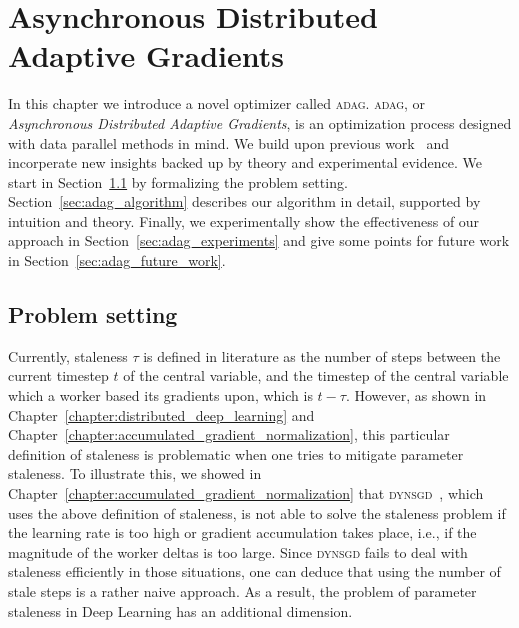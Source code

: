 %
%
%

\chapter{Asynchronous Distributed Adaptive Gradients}
\label{chapter:asynchronous_distributed_adaptive_gradients}

In this chapter we introduce a novel optimizer called \textsc{adag}. \textsc{adag}, or \emph{Asynchronous Distributed Adaptive Gradients}, is an optimization process designed with data parallel methods in mind. We build upon previous work~\cite{dean2012large,hadjis2016omnivore,kingma2014adam,zhang2015deep,jiang2017heterogeneity} and incorperate new insights backed up by theory and experimental evidence. We start in Section~\ref{sec:adag_problem_setting} by formalizing the problem setting. Section~\ref{sec:adag_algorithm} describes our algorithm in detail, supported by intuition and theory. Finally, we experimentally show the effectiveness of our approach in Section~\ref{sec:adag_experiments} and give some points for future work in Section~\ref{sec:adag_future_work}.

\section{Problem setting}
\label{sec:adag_problem_setting}

Currently, staleness $\tau$ is defined in literature as the number of steps between the current timestep $t$ of the central variable, and the timestep of the central variable which a worker based its gradients upon, which is $t - \tau$. However, as shown in Chapter~\ref{chapter:distributed_deep_learning} and Chapter~\ref{chapter:accumulated_gradient_normalization}, this particular definition of staleness is problematic when one tries to mitigate parameter staleness. To illustrate this, we showed in Chapter~\ref{chapter:accumulated_gradient_normalization} that \textsc{dynsgd}~\cite{jiang2017heterogeneity}, which uses the above definition of staleness, is not able to solve the staleness problem if the learning rate is too high or gradient accumulation takes place, i.e., if the magnitude of the worker deltas is too large. Since \textsc{dynsgd} fails to deal with staleness efficiently in those situations, one can deduce that using the number of stale steps is a rather naive approach. As a result, the problem of parameter staleness in Deep Learning has an additional dimension.\\

